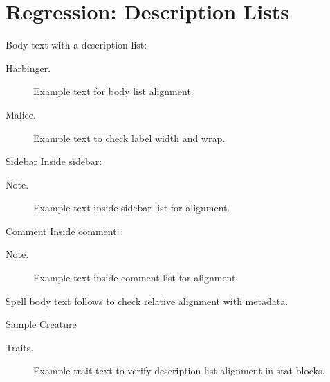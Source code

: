 \documentclass[a4paper,10pt]{dndbook}
\begin{document}
\chapter*{Regression: Description Lists}

Body text with a description list:
\begin{description}
  \item[Harbinger.] Example text for body list alignment.
  \item[Malice.] Example text to check label width and wrap.
\end{description}

\begin{DndSidebar}{Sidebar}
Inside sidebar:
\begin{description}
  \item[Note.] Example text inside sidebar list for alignment.
\end{description}
\end{DndSidebar}

\begin{DndComment}{Comment}
Inside comment:
\begin{description}
  \item[Note.] Example text inside comment list for alignment.
\end{description}
\end{DndComment}


\par\vspace{6pt}
Spell body text follows to check relative alignment with metadata.

\par\vspace{12pt}
\begin{DndMonster}{Sample Creature}
\DndMonsterLine
\begin{description}
  \item[Traits.] Example trait text to verify description list alignment in stat blocks.
\end{description}
\end{DndMonster}
\end{document}
